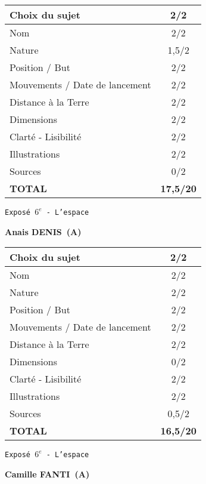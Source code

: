 	\vspace*{2cm}
	\begin{tabular}{|l|c|}
		\hline
		Choix du sujet & 2/2 \\
		\hline
		Nom & 2/2 \\
		\hline
		Nature & 1,5/2 \\
		\hline
		Position / But & 2/2 \\
		\hline
		Mouvements / Date de lancement & 2/2 \\
		\hline
		Distance \`a la Terre & 2/2 \\
		\hline
		Dimensions & 2/2 \\
		\hline
		Clart\'e - Lisibilit\'e & 2/2 \\
		\hline
		Illustrations & 2/2 \\
		\hline
		Sources & 0/2 \\
		\hline
		\textbf{TOTAL}  & \textbf{17,5/20} \\
		\hline
	\end{tabular}
	\newline
	\LARGE{\texttt{Expos\'e $6^e$ - L'espace}}
	\vspace*{1cm}

	\textbf{Anais DENIS\ (A)}

	\vspace*{2cm}
	\begin{tabular}{|l|c|}
		\hline
		Choix du sujet & 2/2 \\
		\hline
		Nom & 2/2 \\
		\hline
		Nature & 2/2 \\
		\hline
		Position / But & 2/2 \\
		\hline
		Mouvements / Date de lancement & 2/2 \\
		\hline
		Distance \`a la Terre & 2/2 \\
		\hline
		Dimensions & 0/2 \\
		\hline
		Clart\'e - Lisibilit\'e & 2/2 \\
		\hline
		Illustrations & 2/2 \\
		\hline
		Sources & 0,5/2 \\
		\hline
		\textbf{TOTAL}  & \textbf{16,5/20} \\
		\hline
	\end{tabular}
	\newline
	\LARGE{\texttt{Expos\'e $6^e$ - L'espace}}
	\vspace*{1cm}

	\textbf{Camille FANTI\ (A)}

